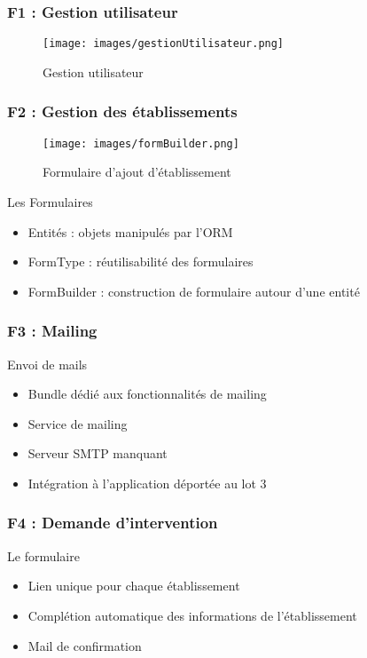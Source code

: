 \speaker{\Florian}

\begin{frame}
\frametitle{F1 : Gestion utilisateur}
      \begin{figure}[h]
	\texttt{[image: images/gestionUtilisateur.png]}
	\caption{Gestion utilisateur}
		  \end{figure}

\end{frame}

\begin{frame}
\frametitle{F2 : Gestion des établissements}
\begin{minipage}[c]{.35\linewidth}
      \begin{figure}[h]
		\texttt{[image: images/formBuilder.png]}
			\caption{\small{Formulaire d'ajout d'établissement}}
	  \end{figure}
   \end{minipage} \hfill
   \begin{minipage}[c]{.4\linewidth}
      \begin{block}{Les Formulaires}
		\begin{itemize}
			\item Entités : objets manipulés par l'ORM
			\item FormType : réutilisabilité des formulaires
			\item FormBuilder : construction de formulaire autour d'une entité
		\end{itemize}
	  \end{block}
   \end{minipage} \hfill
\end{frame}

\begin{frame}
\frametitle{F3 : Mailing}
\begin{block}{Envoi de mails}
	\begin{itemize}
		\item Bundle dédié aux fonctionnalités de mailing
		\item Service de mailing
		\item Serveur SMTP manquant
		\item Intégration à l'application déportée au lot 3
	\end{itemize}
\end{block}
\end{frame}

\begin{frame}
\frametitle{F4 : Demande d'intervention}
\begin{block}{Le formulaire}
	\begin{itemize}
		\item Lien unique pour chaque établissement
		\item Complétion automatique des informations de l'établissement
		\item Mail de confirmation
	\end{itemize}
\end{block}
\end{frame}
